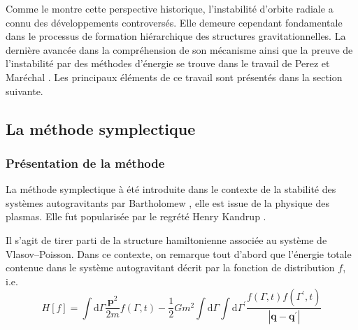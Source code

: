 Comme le montre cette perspective historique, l'instabilité d'orbite radiale a connu des développements controversés. Elle demeure cependant fondamentale dans le processus de formation hiérarchique des structures gravitationnelles. La dernière avancée dans la compréhension de son mécanisme ainsi que la preuve de l'instabilité par des méthodes d'énergie se trouve dans le travail de Perez et Maréchal \cite{future}. Les principaux éléments de ce travail sont présentés dans la section suivante.  

\subsection{La méthode symplectique}

\subsubsection{Présentation de la méthode}

La méthode symplectique à été introduite dans le contexte de la stabilité des systèmes autogravitants par Bartholomew \cite{bartho}, elle est issue de la physique des plasmas. Elle fut popularisée par le regrété Henry Kandrup \cite{kandrupstability}.

Il s'agit de tirer parti de la structure hamiltonienne associée au système de Vlasov--Poisson. Dans ce contexte, on remarque tout d'abord que l'énergie totale contenue dans le système autogravitant décrit par la fonction de distribution $f$, i.e.
\[
	H \left[ f \right]  =
	\int \mathrm{d} {\Gamma}
		\frac{\mathbf{p}^{2}}{2m} f \left( {\Gamma},t \right)
	- \frac{1}{2} Gm^2 \int \mathrm{d} {\Gamma} \int\mathrm{d}{\Gamma}^{\prime}
		\frac{f \left({\Gamma},t \right) f\left( {\Gamma}^{\prime},t\right)}%
		{\left\vert \mathbf{q} - \mathbf{q}^{\prime} \right\vert }
\]

